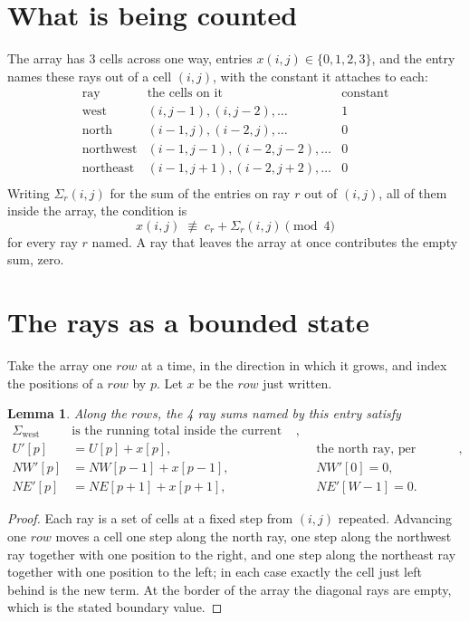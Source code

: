 \documentclass[11pt,a4paper]{article}
\theoremstyle{plain}
\newtheorem{lemma}[theorem]{Lemma}
\theoremstyle{definition}
\begin{document}
\section{What is being counted}

The array has $3$ cells across one way, entries $x(i,j)\in\{0,1,2,3\}$, and the entry names these
rays out of a cell $(i,j)$, with the constant it attaches to each:
\[
\begin{array}{lll}
\text{ray} & \text{the cells on it} & \text{constant} \\[2pt]
\text{west} & (i,j-1),(i,j-2),\dots & 1 \\
\text{north} & (i-1,j),(i-2,j),\dots & 0 \\
\text{northwest} & (i-1,j-1),(i-2,j-2),\dots & 0 \\
\text{northeast} & (i-1,j+1),(i-2,j+2),\dots & 0 \\
\end{array}
\]
Writing $\Sigma_r(i,j)$ for the sum of the entries on ray $r$ out of $(i,j)$, all of them
inside the array, the condition is
\[
x(i,j)\;\not\equiv\;c_r+\Sigma_r(i,j) \pmod{4}
\]
for every ray $r$ named. A ray that leaves the array at once contributes the empty sum,
zero.

\section{The rays as a bounded state}

Take the array one $row$ at a time, in the direction in which it grows, and index the
positions of a $row $ by $p$. Let $x$ be the $row$ just written.

\begin{lemma}\label{lem:rays}
Along the $row$s, the 4 ray sums named by this entry satisfy
\[
\begin{aligned}
\Sigma_{\mathrm{west}}\ &\text{is the running total inside the current row},\\
U'[p]&=U[p]+x[p], &&\text{the north ray, per position},\\
NW'[p]&=NW[p-1]+x[p-1], && NW'[0]=0,\\
NE'[p]&=NE[p+1]+x[p+1], && NE'[W-1]=0 .
\end{aligned}
\]
\end{lemma}

\begin{proof}
Each ray is a set of cells at a fixed step from $(i,j)$ repeated. Advancing one $row$
moves a cell one step along the north ray, one step along the northwest ray together with one
position to the right, and one step along the northeast ray together with one position to the
left; in each case exactly the cell just left behind is the new term. At the border of the
array the diagonal rays are empty, which is the stated boundary value.
\end{proof}
\end{document}
